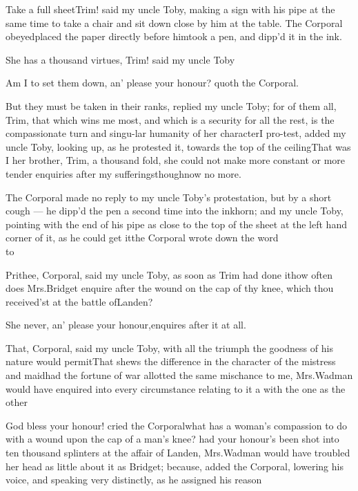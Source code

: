 \documentclass{article}
\begin{document}
\newpage
Take a full sheet\tsh Trim! said my uncle
Toby, making a sign with his pipe at the same time to take a
chair and sit down close by him at the table. The Corporal
obeyed\tsh placed the paper directly before
him\tsh took a pen, and dipp’d it in the ink.

\tsk She has a thousand virtues, Trim! said my uncle
Toby\tsh

Am I to set them down, an’ please your honour? quoth the
Corporal.

\tsh But they must be taken in their ranks, replied my
uncle Toby; for of them all, Trim, that which wins me
most, and which is a security for all the rest, is the
compassionate turn and singu-\pb lar humanity of her character\tsk I
pro-\break test, added my uncle Toby, looking up, as he protested
it, towards the top of the ceiling\tsk That was I her brother, Trim, a
thousand fold, she could not make more constant or more tender
enquiries after my sufferings\tsh though\break now no more.

The Corporal made no reply to my uncle Toby’s protestation, but by a short cough —
he dipp’d the pen a second time into the inkhorn; and my uncle Toby, pointing with
the end of his pipe as close to the top of the sheet at the left hand corner of it,
as he could get it\tsh the Corporal wrote down the word\\ 
\hbox to 

\newpage
Prithee, Corporal, said my uncle Toby, as soon as Trim had done it\tsh how often
does Mrs.\@ Bridget enquire after the wound on the cap of thy knee, which thou
received’st at the battle of\break Landen?

She never, an’ please your honour,\break enquires after it at all.

That, Corporal, said my uncle Toby, with all the triumph the goodness of his nature
would permit\tsh That shews the difference in the character of the mistress and
maid\tsh had the fortune of war allotted the same mischance to me, Mrs.\@ Wadman
would have enquired into every circumstance relating to it a\pb 
{}
with the one as the other\tsh

\tsh God bless your honour! cried the
Corporal\tsh what has a woman’s compassion to do
with a wound upon the cap of a man’s knee? had your
honour’s been shot into ten thousand splinters at the affair
of Landen, Mrs.\@ Wadman would have troubled her head
as little about it as Bridget; because, added the Corporal,
lowering his voice, and speaking very distinctly, as he assigned
his reason\tsh
\end{document}
